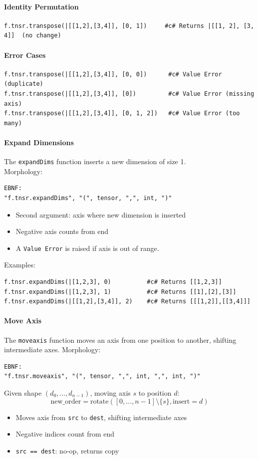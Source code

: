 \paragraph{Identity Permutation}
\begin{verbatim}
f.tnsr.transpose(|[[1,2],[3,4]], [0, 1])     #c# Returns |[[1, 2], [3, 4]]  (no change)
\end{verbatim}

\paragraph{Error Cases}
\begin{verbatim}
f.tnsr.transpose(|[[1,2],[3,4]], [0, 0])      #c# Value Error (duplicate)
f.tnsr.transpose(|[[1,2],[3,4]], [0])         #c# Value Error (missing axis)
f.tnsr.transpose(|[[1,2],[3,4]], [0, 1, 2])   #c# Value Error (too many)
\end{verbatim}

\paragraph{Expand Dimensions}
The \texttt{expandDims} function inserts a new dimension of size 1.\\
Morphology:
\begin{verbatim}
EBNF:
"f.tnsr.expandDims", "(", tensor, ",", int, ")"
\end{verbatim}
\begin{itemize}
\item Second argument: axis where new dimension is inserted
\item Negative axis counts from end
\item A \texttt{Value Error} is raised if axis is out of range.
\end{itemize}
Examples:
\begin{verbatim}
f.tnsr.expandDims(|[1,2,3], 0)          #c# Returns [[1,2,3]]
f.tnsr.expandDims(|[1,2,3], 1)          #c# Returns [[1],[2],[3]]
f.tnsr.expandDims(|[[1,2],[3,4]], 2)    #c# Returns [[[1,2]],[[3,4]]]
\end{verbatim}

\paragraph{Move Axis}
The \texttt{moveaxis} function moves an axis from one position to another, shifting intermediate axes.
Morphology:
\begin{verbatim}
EBNF:
"f.tnsr.moveaxis", "(", tensor, ",", int, ",", int, ")"
\end{verbatim}
Given shape $(d_0, \ldots, d_{n-1})$, moving axis $s$ to position $d$:
\[
\text{new\_order} = \text{rotate}( [0, \ldots, n{-}1] \setminus \{s\}, \text{insert}=d )
\]
\begin{itemize}
\item Moves axis from \texttt{src} to \texttt{dest}, shifting intermediate axes
\item Negative indices count from end
\item \texttt{src == dest}: no-op, returns copy
\end{itemize}

